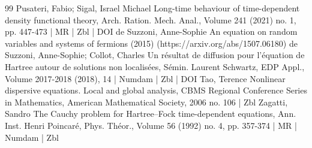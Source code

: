 \documentclass[10pt]{amsart}
\theoremstyle{definition}\newtheorem{defi}[theo]{Definition}\newtheorem{rema}[theo]{Remark}\newtheorem{exam}[theo]{Example}\newtheorem{exem}[theo]{Example}\newtheorem{nota}[theo]{Notation}
\begin{document}
\begin{thebibliography}{99}
Pusateri, Fabio; Sigal, Israel Michael Long-time behaviour of time-dependent density functional theory, Arch. Ration. Mech. Anal., Volume 241 (2021) no. 1, pp. 447-473 | MR | Zbl | DOI
de Suzzoni, Anne-Sophie An equation on random variables and systems of fermions (2015) (https://arxiv.org/abs/1507.06180)
de Suzzoni, Anne-Sophie; Collot, Charles Un résultat de diffusion pour l’équation de Hartree autour de solutions non localisées, Sémin. Laurent Schwartz, EDP Appl., Volume 2017-2018 (2018), 14 | Numdam | Zbl | DOI
Tao, Terence Nonlinear dispersive equations. Local and global analysis, CBMS Regional Conference Series in Mathematics, American Mathematical Society, 2006 no. 106 | Zbl
Zagatti, Sandro The Cauchy problem for Hartree–Fock time-dependent equations, Ann. Inst. Henri Poincaré, Phys. Théor., Volume 56 (1992) no. 4, pp. 357-374 | MR | Numdam | Zbl
\end{thebibliography}
\end{document}
